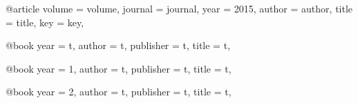 @article{
volume = {volume},
journal = {journal},
year = {2015},
author = {author},
title = {title},
key = {key},
}

@book{
year = {t},
author = {t},
publisher = {t},
title = {t},
}

@book{
year = {1},
author = {t},
publisher = {t},
title = {t},
}

@book{
year = {2},
author = {t},
publisher = {t},
title = {t},
}

